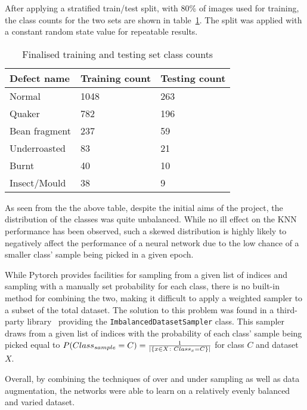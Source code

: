 After applying a stratified train/test split, with 80\% of images used for training, the class counts for the two sets are
shown in table~\ref{tab:finalTrainTestClassCuts}.
The split was applied with a constant random state value for repeatable results.
\begin{table}[h]
    \centering
    \begin{tabular}{lll}
        \toprule
        \textbf{Defect name} & \textbf{Training count} & \textbf{Testing count} \\
        \midrule
        Normal & 1048 & 263 \\
        Quaker & 782 & 196 \\
        Bean fragment & 237 & 59 \\
        Underroasted & 83 & 21 \\
        Burnt & 40 & 10 \\
        Insect/Mould & 38 & 9 \\
        \bottomrule
    \end{tabular}
    \caption{Finalised training and testing set class counts}
    \label{tab:finalTrainTestClassCuts}
\end{table}

As seen from the the above table, despite the initial aims of the project, the distribution of the classes was quite unbalanced.
While no ill effect on the KNN performance has been observed, such a skewed distribution is highly likely to negatively
affect the performance of a neural network due to the low chance of a smaller class' sample being picked in a given epoch.

While Pytorch provides facilities for sampling from a given list of indices and sampling with a manually set probability for each class,
there is no built-in method for combining the two, making it difficult to apply a weighted sampler to a subset of the total dataset.
The solution to this problem was found in a third-party library~\cite{imbalancedSampler} providing the \verb|ImbalancedDatasetSampler| class.
This sampler draws from a given list of indices with the probability of each class' sample being picked equal to
$P(Class_{sample} = C) = \frac{1}{\arrowvert\{x \in X \colon Class_x = C\}\arrowvert}$ for class $C$ and dataset $X$.

Overall, by combining the techniques of over and under sampling as well as data augmentation, the networks were able to learn on a relatively
evenly balanced and varied dataset.
